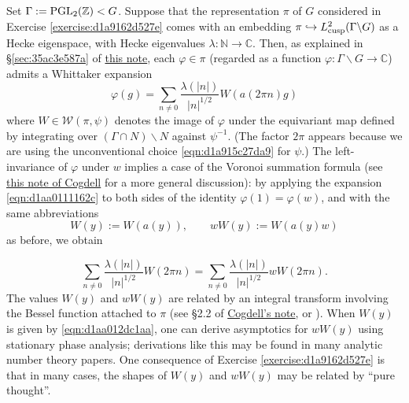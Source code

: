 \documentclass[reqno]{amsart} 
\numberwithin{equation}{section}
\begin{document}
\begin{remark}
  Set $\Gamma := \operatorname{PGL}_{2}(\mathbb{Z}) < G$.  Suppose that the representation $\pi$ of $G$ considered in Exercise \ref{exercise:d1a9162d527e} comes with an embedding $\pi \hookrightarrow L^2_{\operatorname{cusp}}(\Gamma \backslash G)$ as a Hecke eigenspace, with Hecke eigenvalues $\lambda : \mathbb{N} \rightarrow \mathbb{C}$.  Then, as explained in \S\ref{sec:35ac3e587a} of \href{20230522T190340__pgl2-spectral-aspect-subconvexity_expository.pdf}{this note}, each $\varphi \in \pi$ (regarded as a function $\varphi : \Gamma \backslash G \rightarrow \mathbb{C}$) admits a Whittaker expansion
  \begin{equation}\label{eqn:d1aa0111162c}
    \varphi(g) = \sum_{n \neq 0} \frac{\lambda (\lvert n \rvert)}{ \lvert n \rvert^{1/2} } W (a (2 \pi n) g)
  \end{equation}
  where $W \in \mathcal{W}(\pi,\psi)$ denotes the image of $\varphi$ under the equivariant map defined by integrating over $(\Gamma \cap N) \backslash N$ against $\psi^{-1}$.  (The factor $2 \pi$ appears because we are using the unconventional choice \eqref{eqn:d1a915c27da9} for $\psi$.)  The left-invariance of $\varphi$ under $w$ implies a case of the Voronoi summation formula (see \href{https://people.math.osu.edu/cogdell.1/bessel-www.pdf}{this note of Cogdell} for a more general discussion): by applying the expansion \eqref{eqn:d1aa0111162c} to both sides of the identity $\varphi(1) = \varphi(w)$, and with the same abbreviations
  \begin{equation*}
    W(y) := W(a(y)),
    \qquad
    w W(y) := W(a(y) w)
  \end{equation*}
  as before, we obtain

\begin{equation*}
  \sum_{n \neq 0 } \frac{\lambda (\lvert n \rvert)}{ \lvert n \rvert^{1/2} }
  W(2 \pi n)
  =
  \sum_{n \neq 0 } \frac{\lambda (\lvert n \rvert)}{ \lvert n \rvert^{1/2} }
  w W(2 \pi n).
\end{equation*}
The values $W(y)$ and $w W(y)$ are related by an integral transform involving the Bessel function attached to $\pi$ (see \S2.2 of \href{https://people.math.osu.edu/cogdell.1/bessel-www.pdf}{Cogdell's note}, or \cite[Appendix A]{KMV02}).  When $W(y)$ is given by \eqref{eqn:d1aa012dc1aa}, one can derive asymptotics for $w W(y)$ using stationary phase analysis; derivations like this may be found in many analytic number theory papers.  One consequence of Exercise \ref{exercise:d1a9162d527e} is that in many cases, the shapes of $W(y)$ and $w W(y)$ may be related by ``pure thought''.
\end{remark}
\end{document}

